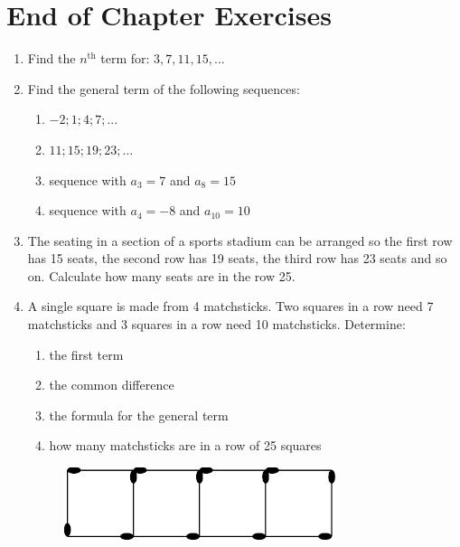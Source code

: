             \section{End of Chapter Exercises}
            \nopagebreak
      \label{m39362*id66867}\begin{enumerate}[noitemsep, label=\textbf{\arabic*}. ] 
            \label{m39362*uid30}\item Find the ${n}^{\mathrm{th}}$ term for: $3,7,11,15,...$
        \label{m39362*uid31}\item Find the general term of the following sequences:
\label{m39362*id66935}\begin{enumerate}[noitemsep, label=\textbf{\alph*}. ] 
            \label{m39362*uid32}\item $-2;1;4;7;...$\label{m39362*uid33}\item $11;15;19;23;...$\label{m39362*uid34}\item sequence with ${a}_{3}=7$ and ${a}_{8}=15$\label{m39362*uid35}\item sequence with ${a}_{4}=-8$ and ${a}_{10}=10$\end{enumerate}
        \label{m39362*uid36}\item The seating in a section of a sports stadium can be arranged so the first row has 15 seats, the second row has 19 seats, the third row has 23 seats and so on. Calculate how many seats are in the row 25.
        \label{m39362*uid43}\item A single square is made from 4 matchsticks. Two squares in a row need 7 matchsticks and 3 squares in a row need 10 matchsticks. Determine:
\label{m39362*id67360}\begin{enumerate}[noitemsep, label=\textbf{\alph*}. ] 
            \label{m39362*uid44}\item the first term
\label{m39362*uid45}\item the common difference
\label{m39362*uid46}\item the formula for the general term
\label{m39362*uid47}\item how many matchsticks are in a row of 25 squares
\end{enumerate}
    \setcounter{subfigure}{0}
	\begin{figure}[H] %
    \begin{center}
    \label{m39362*id67417!!!underscore!!!media}\label{m39362*id67417!!!underscore!!!printimage}\includegraphics[width=300px]{col11306.imgs/m39362_MG10C7_004.png} %

\end{center}
\end{figure}
\end{enumerate}
